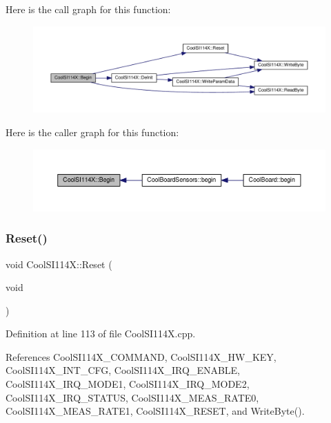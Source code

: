 Here is the call graph for this function\+:
\nopagebreak
\begin{figure}[H]
\begin{center}
\leavevmode
\includegraphics[width=350pt]{dd/d67/class_cool_s_i114_x_a206b36aca7049f63be1d11088c30a09f_cgraph}
\end{center}
\end{figure}
Here is the caller graph for this function\+:\nopagebreak
\begin{figure}[H]
\begin{center}
\leavevmode
\includegraphics[width=350pt]{dd/d67/class_cool_s_i114_x_a206b36aca7049f63be1d11088c30a09f_icgraph}
\end{center}
\end{figure}
\mbox{\label{class_cool_s_i114_x_a9d9f9c9129c0c29ed497f8563f3dd823}} 
\subsubsection{\texorpdfstring{Reset()}{Reset()}}
{\footnotesize\ttfamily void Cool\+S\+I114\+X\+::\+Reset (\begin{DoxyParamCaption}\item[{void}]{ }\end{DoxyParamCaption})}



Definition at line 113 of file Cool\+S\+I114\+X.\+cpp.



References Cool\+S\+I114\+X\+\_\+\+C\+O\+M\+M\+A\+ND, Cool\+S\+I114\+X\+\_\+\+H\+W\+\_\+\+K\+EY, Cool\+S\+I114\+X\+\_\+\+I\+N\+T\+\_\+\+C\+FG, Cool\+S\+I114\+X\+\_\+\+I\+R\+Q\+\_\+\+E\+N\+A\+B\+LE, Cool\+S\+I114\+X\+\_\+\+I\+R\+Q\+\_\+\+M\+O\+D\+E1, Cool\+S\+I114\+X\+\_\+\+I\+R\+Q\+\_\+\+M\+O\+D\+E2, Cool\+S\+I114\+X\+\_\+\+I\+R\+Q\+\_\+\+S\+T\+A\+T\+US, Cool\+S\+I114\+X\+\_\+\+M\+E\+A\+S\+\_\+\+R\+A\+T\+E0, Cool\+S\+I114\+X\+\_\+\+M\+E\+A\+S\+\_\+\+R\+A\+T\+E1, Cool\+S\+I114\+X\+\_\+\+R\+E\+S\+ET, and Write\+Byte().



